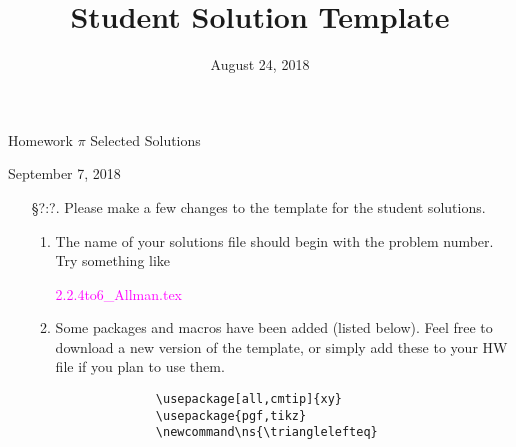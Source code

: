 \documentclass{report}
\title{Student Solution Template}
\date{August 24, 2018}
\newcommand{\assignmentNumber}[1]{Homework #1 Selected Solutions}
\newcommand{\duedate}[1]{#1}
\theoremstyle{plain}
\begin{document}
 

\centerline{\sc \Large \assignmentNumber{$\pi$}}
\smallskip
\centerline{\duedate{September 7, 2018}}

\begin{enumerate}

\item[\S ?:?.]  Please make a few changes to the template for the student solutions.

\begin{enumerate}

\item The name of your solutions file should begin with the problem number.  Try something like

\centerline{\textcolor{magenta}{2.2.4to6\_Allman.tex}}

\item Some packages and macros have been added (listed below).  Feel free to download a new version
of the template, or simply add these to your HW file if you plan to use them.

\begin{verbatim}
              \usepackage[all,cmtip]{xy}
              \usepackage{pgf,tikz} 
              \newcommand\ns{\trianglelefteq} 
\end{verbatim}

\end{enumerate}

\end{enumerate}
\end{document}
